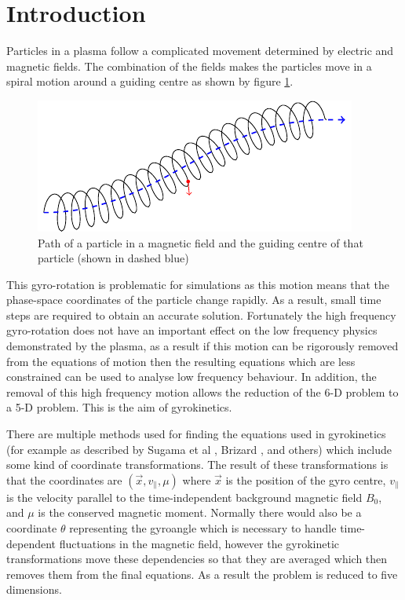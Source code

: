 
\section{Introduction}

Particles in a plasma follow a complicated movement determined by electric and magnetic fields. The combination of the fields makes the particles move in a spiral motion around a guiding centre as shown by figure \ref{fig::guiding centre}.

\begin{figure}[ht]
 \centering
 \includegraphics[width=.8\textwidth]{Figs/GyrokineticPrinciple}
 \caption{\label{fig::guiding centre}Path of a particle in a magnetic field and the guiding centre of that particle (shown in dashed blue)}
\end{figure}

This gyro-rotation is problematic for simulations as this motion means that the phase-space coordinates of the particle change rapidly. As a result, small time steps are required to obtain an accurate solution. Fortunately the high frequency gyro-rotation does not have an important effect on the low frequency physics demonstrated by the plasma, as a result if this motion can be rigorously removed from the equations of motion then the resulting equations which are less constrained can be used to analyse low frequency behaviour. In addition, the removal of this high frequency motion allows the reduction of the 6-D problem to a 5-D problem. This is the aim of gyrokinetics.

There are multiple methods used for finding the equations used in gyrokinetics (for example as described by Sugama et al \cite{Sugama2000}, Brizard \cite{BrizardGyro2000}, and others) which include some kind of coordinate transformations. The result of these transformations is that the coordinates are $(\vec{x},v_\parallel,\mu)$ where $\vec{x}$ is the position of the gyro centre, $v_\parallel$ is the velocity parallel to the time-independent background magnetic field $B_0$, and $\mu$ is the conserved magnetic moment. Normally there would also be a coordinate $\theta$ representing the gyroangle which is necessary to handle time-dependent fluctuations in the magnetic field, however the gyrokinetic transformations move these dependencies so that they are averaged which then removes them from the final equations. As a result the problem is reduced to five dimensions.

